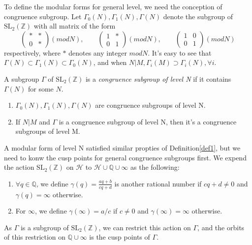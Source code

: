     To define the modular forms for general level, we need the conception of congruence subgroup. Let $\Gamma_0(N), \Gamma_1(N), \Gamma(N)$ denote the subgroup of $\mathrm{SL}_2(\mathbb{Z})$ with all matrix of the form 
    \begin{equation*}
        \left(
        \begin{smallmatrix}
            * & * \\
            0 & *
        \end{smallmatrix}
    \right)(mod N),
    \qquad
    \left(
        \begin{smallmatrix}
            1 & * \\
            0 & 1
        \end{smallmatrix}
    \right)(mod N),
    \qquad
    \left(
        \begin{smallmatrix}
            1 & 0 \\
            0 & 1
        \end{smallmatrix}
    \right)(mod N)
    \end{equation*}
    respectively, where $*$ denotes any integer $mod N$. It's easy to see that $\Gamma(N)\subset \Gamma_1(N)\subset \Gamma_0(N)$, and when $N|M, \Gamma_i(M)\supset \Gamma_i(N), \forall i$.

    \begin{definition}
        A subgroup $\Gamma$ of $\mathrm{SL}_2(\mathbb{Z})$ is a \textit{congruence subgroup of level N} if it contains $\Gamma(N)$ for some $N$.
    \end{definition}

    \begin{remark}
        \begin{enumerate}
            \item $\Gamma_0(N), \Gamma_1(N), \Gamma(N)$ are congruence subgroups of level N.
            \item If $N|M$ and $\Gamma$ is a congruence subgroup of level N, then it's a congruence subgroups of level M. 
        \end{enumerate}
    \end{remark}

    A modular form of level N satisfied similar propties of Definition\ref{def1}, but we need to konw the cusp points for general congruence subgroups first. We expend  the action $\mathrm{SL}_2(\mathbb{Z})$ on $\mathcal{H}$ to $\mathcal{H}\cup \mathbb{Q}\cup {\infty}$ as the following:
    \begin{enumerate}
        \item $\forall q\in \mathbb{Q}$, we define $\gamma(q)=\frac{aq+b}{cq+d}$ is another rational number if $cq+d\neq 0$ and $\gamma(q)=\infty$ otherwise.
        \item For $\infty$, we define $\gamma(\infty)=a/c$ if $c\neq 0$ and $\gamma(\infty)=\infty$ otherwise.
    \end{enumerate}
    As $\Gamma$ is a subgroup of $\mathrm{SL}_2(\mathbb{Z})$, we can restrict this action on $\Gamma$, and the orbits of this restriction  on $\mathbb{Q}\cup {\infty}$ is the cusp points of $\Gamma$. 

